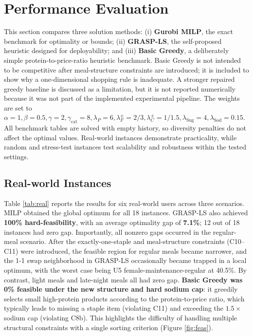 \documentclass[a4paper]{article}
\begin{document}
\section{Performance Evaluation}\label{sec:exp}
This section compares three solution methods: (i) \textbf{Gurobi MILP}, the exact benchmark for optimality or bounds; (ii) \textbf{GRASP-LS}, the self-proposed heuristic designed for deployability; and (iii) \textbf{Basic Greedy}, a deliberately simple protein-to-price-ratio heuristic benchmark. Basic Greedy is not intended to be competitive after meal-structure constraints are introduced; it is included to show why a one-dimensional shopping rule is inadequate. A stronger repaired greedy baseline is discussed as a limitation, but it is not reported numerically because it was not part of the implemented experimental pipeline. The weights are set to $\alpha=1, \beta=0.5, \gamma=2, \gamma_{\text{cat}}=8, \lambda_P=6, \lambda^\pm_F = 2/3, \lambda^\pm_C = 1/1.5, \lambda_{\text{Sug}}=4, \lambda_{\text{Sod}}=0.15$. All benchmark tables are solved with empty history, so diversity penalties do not affect the optimal values. Real-world instances demonstrate practicality, while random and stress-test instances test scalability and robustness within the tested settings.

\subsection{Real-world Instances}
Table \ref{tab:real} reports the results for six real-world users across three scenarios. MILP obtained the global optimum for all 18 instances. GRASP-LS also achieved \textbf{100\% hard-feasibility}, with an average optimality gap of \textbf{7.1\%}; 12 out of 18 instances had zero gap. Importantly, all nonzero gaps occurred in the regular-meal scenario. After the exactly-one-staple and meal-structure constraints (C10--C11) were introduced, the feasible region for regular meals became narrower, and the 1-1 swap neighborhood in GRASP-LS occasionally became trapped in a local optimum, with the worst case being U5 female-maintenance-regular at 40.5\%. By contrast, light meals and late-night meals all had zero gap. \textbf{Basic Greedy was 0\% feasible under the new structure and hard sodium cap}: it greedily selects small high-protein products according to the protein-to-price ratio, which typically leads to missing a staple item (violating C11) and exceeding the $1.5\times$ sodium cap (violating C8b). This highlights the difficulty of handling multiple structural constraints with a single sorting criterion (Figure \ref{fig:feas}).
\end{document}
